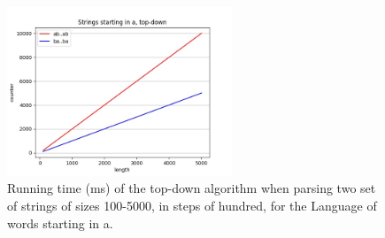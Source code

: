 \begin{figure}[h!]
    \centering
    \includegraphics[width=0.6\textwidth]{Resources/c_sa_td.jpg}
    \caption{Running time (ms) of the top-down algorithm when parsing two set of strings of sizes 100-5000, in steps of hundred, for the Language of words starting in a.}
    \label{fig:c_sa_td}
\end{figure}



